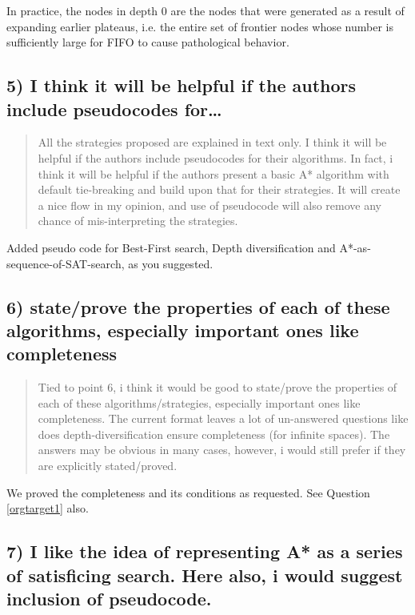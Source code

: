 \documentclass{article}
\begin{document}
In practice,
the nodes in depth 0 are the nodes that were generated as a result of expanding earlier plateaus,
i.e. the entire set of frontier nodes whose number is sufficiently large for FIFO
to cause pathological behavior.

\subsection{5) I think it will be helpful if the authors include pseudocodes for\ldots{}}
\label{sec:orgheadline19}

\begin{quote}
 All the strategies proposed are explained in text only. I think it
will be helpful if the authors include pseudocodes for their
algorithms. In fact, i think it will be helpful if the authors present
a basic A* algorithm with default tie-breaking and build upon that for
their strategies. It will create a nice flow in my opinion, and use of
pseudocode will also remove any chance of mis-interpreting the
strategies.
\end{quote}

Added pseudo code for Best-First search, Depth diversification and A*-as-sequence-of-SAT-search,
as you suggested.

\subsection{6) state/prove the properties of each of these algorithms, especially important ones like completeness}
\label{sec:orgheadline20}

\begin{quote}
 Tied to point 6, i think it would be good to state/prove the
properties of each of these algorithms/strategies, especially
important ones like completeness. The current format leaves a lot of
un-answered questions like does depth-diversification ensure
completeness (for infinite spaces). The answers may be obvious in many
cases, however, i would still prefer if they are explicitly
stated/proved.
\end{quote}

We proved the completeness and its conditions as requested. See Question \ref{orgtarget1} also.

\subsection{7) I like the idea of representing A* as a series of satisficing search. Here also, i would suggest inclusion of pseudocode.}
\label{sec:orgheadline21}
\end{document}
